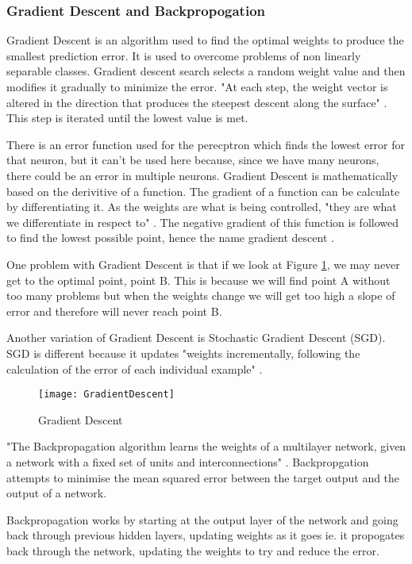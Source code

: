 \subsubsection*{Gradient Descent and Backpropogation}
Gradient Descent is an algorithm used to find the optimal weights to produce the
smallest prediction error. It is used to overcome problems of non linearly
separable classes. Gradient descent search selects a random weight value and
then modifies it gradually to minimize the error. "At each step, the weight
vector is altered in the direction that produces the steepest descent along the
surface" \parencite{MLANN}. This step is iterated until the lowest value is met.

There is an error function used for the perecptron which finds the lowest error for that neuron, but it can't be used here because, since we have many neurons, there could be an error in multiple neurons.
Gradient Descent is mathematically based on the derivitive of a function.
The gradient of a function can be calculate by differentiating it.
As the weights are what is being controlled, "they are what we differentiate in respect to" \parencite{MLAlgorithm}.
The negative gradient of this function is followed to find the lowest possible point, hence the name gradient descent \parencite{MLAlgorithm}.

One problem with Gradient Descent is that if we look at Figure \ref{fig:GD}, we may
never get to the optimal point, point B. This is because we will find point A
without too many problems but when the weights change we will get too high a
slope of error and therefore will never reach point B.

Another variation of Gradient Descent is Stochastic Gradient Descent (SGD). SGD
is different because it updates "weights incrementally, following the
calculation of the error of each individual example" \parencite{MLANN}. 

\begin{figure}[h]
      \texttt{[image: GradientDescent]}
      \caption{Gradient Descent}
      \label{fig:GD}
 \end{figure}

"The Backpropagation algorithm learns the weights of a multilayer network,
given a network with a fixed set of units and interconnections" \parencite{MLANN}.
Backpropgation attempts to minimise the mean squared error between the target
output and the output of a network.

Backpropagation works by starting at the output layer of the network and going
back through previous hidden layers, updating weights as it goes ie. it propogates back through the network, updating the weights to try and reduce the error.

